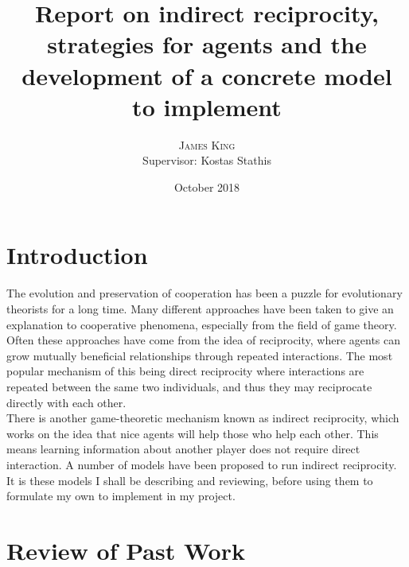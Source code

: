 \documentclass[twoside,twocolumn]{article}
\title{ Report on indirect reciprocity, strategies for agents and the development of a concrete model to implement} %
\author{%
\textsc{James King} \\%
\normalsize Supervisor: Kostas Stathis \\ %
}
\date{October 2018} %
\begin{document}



\maketitle


\section{Introduction}
The evolution and preservation of cooperation has been a puzzle for evolutionary theorists for a long time. Many different approaches have been taken to give an explanation to cooperative phenomena, especially from the field of game theory. Often these approaches have come from the idea of reciprocity, where agents can grow mutually beneficial relationships through repeated interactions. The most popular mechanism of this being direct reciprocity where interactions are repeated between the same two individuals, and thus they may reciprocate directly with each other.\\
There is another game-theoretic mechanism known as indirect reciprocity, which works on the idea that nice agents will help those who help each other. This means learning information about another player does not require direct interaction. A number of models have been proposed to run indirect reciprocity. It is these models I shall be describing and reviewing, before using them to formulate my own to implement in my project.



\section{Review of Past Work}
\end{document}
